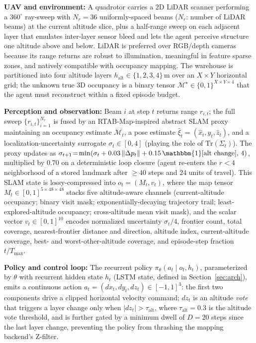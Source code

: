 \documentclass[conference]{IEEEtran}
\begin{document}
\textbf{UAV and environment:} A quadrotor carries a 2D LiDAR scanner performing a $360^\circ$ ray-sweep with $N_r\!=\!36$ uniformly-spaced beams ($N_r$: number of LiDAR beams) at the current altitude slice, plus a half-range sweep on each adjacent layer that emulates inter-layer sensor bleed and lets the agent perceive structure one altitude above and below. LiDAR is preferred over RGB/depth cameras because its range returns are robust to illumination, meaningful in feature sparse zones, and natively compatible with occupancy mapping. The warehouse is partitioned into four altitude layers $h_{\text{alt}}\!\in\!\{1,2,3,4\}\,\text{m}$ over an $X\!\times\!Y$ horizontal grid; the unknown true 3D occupancy is a binary tensor $\mathcal{M}^{\star}\!\in\!\{0,1\}^{X\times Y\times 4}$ that the agent must reconstruct within a fixed episode budget.

\textbf{Perception and observation:} Beam $i$ at step $t$ returns range $r_{i,t}$; the full sweep $\{r_{i,t}\}_{i=1}^{N_r}$ is fused by an RTAB-Map-inspired abstract SLAM proxy maintaining an occupancy estimate $\mathcal{M}_t$, a pose estimate $\hat{\xi}_t\!=\!(\hat{x}_t,\hat{y}_t,\hat{z}_t)$, and a localization-uncertainty surrogate $\sigma_t\!\in\![0,4]$ (playing the role of $\mathrm{Tr}(\Sigma_t)$). The proxy updates as $\sigma_{t+1}\!=\!\min(\sigma_t + 0.03\,\|\Delta p_t\| + 0.15\,\mathbbm{1}[\text{alt change}],\,4)$, multiplied by $0.70$ on a deterministic loop closure (agent re-enters the $r\!<\!4$ neighborhood of a stored landmark after $\geq\!40$ steps and $24$ units of travel). This SLAM state is lossy-compressed into $o_t\!=\!(M_t,v_t)$, where the map tensor $M_t\!\in\![0,1]^{5\times 48\times 48}$ stacks five altitude-aware channels (current-altitude occupancy; binary visit mask; exponentially-decaying trajectory trail; least-explored-altitude occupancy; cross-altitude mean visit mask), and the scalar vector $v_t\!\in\![0,1]^{10}$ encodes normalized uncertainty $\sigma_t/4$, frontier count, total coverage, nearest-frontier distance and direction, altitude index, current-altitude coverage, best- and worst-other-altitude coverage, and episode-step fraction $t/T_{\max}$.

\textbf{Policy and control loop:} The recurrent policy $\pi_\theta(a_t\!\mid\!o_t,h_t)$, parameterized by $\theta$ with recurrent hidden state $h_t$ (LSTM state, defined in Section~\ref{sec:arch}), emits a continuous action $a_t\!=\!(dx_t,dy_t,dz_t)\!\in\![-1,1]^3$: the first two components drive a clipped horizontal velocity command; $dz_t$ is an altitude \emph{vote} that triggers a layer change only when $|dz_t|\!>\!\tau_{\text{alt}}$, where $\tau_{\text{alt}}\!=\!0.3$ is the altitude vote threshold, and is further gated by a minimum dwell of $D\!=\!20$ steps since the last layer change, preventing the policy from thrashing the mapping backend's Z-filter.
\end{document}
